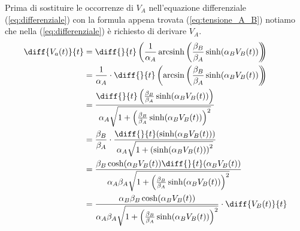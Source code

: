 		Prima di sostituire le occorrenze di $V_{A}$ nell'equazione differenziale (\ref{eq:differenziale}) con la formula appena trovata (\ref{eq:tensione_A_B}) notiamo che nella (\ref{eq:differenziale}) è richiesto di derivare $V_{A}$.
		\begin{equation}
			\label{eq:derivata_va}
			\begin{split}
				\diff{V_{a}(t)}{t} &= \diff{}{t}\left(\frac{1}{\alpha_{A}} \arcsinh \left(\frac{\beta_{B}}{\beta_{A}} \sinh(\alpha_{B}V_{B}(t))\right)\hspace{-5px}\right)\\
				&= \frac{1}{\alpha_{A}}\cdot\diff{}{t}\left(\arcsin\left(\frac{\beta_{B}}{\beta_{A}}\sinh(\alpha_{B}V_{B}(t))\right)\hspace{-5px}\right)\\
				&= \frac{\diff{}{t}\left(\frac{\beta_{B}}{\beta_{A}}\sinh(\alpha_{B}V_{B}(t))\right)}{\alpha_{A}\sqrt{1+\left(\frac{\beta_{B}}{\beta_{A}}\sinh(\alpha_{B}V_{B}(t))\right)^{2}}}\\
				&= \frac{\beta_{B}}{\beta_{A}}\cdot\frac{\diff{}{t}(\sinh(\alpha_{B}V_{B}(t)))}{\alpha_{A}\sqrt{1+\left(\sinh(\alpha_{B}V_{B}(t))\right)^{2}}}\\
				&= \frac{\beta_{B}\cosh(\alpha_{B}V_{B}(t))\diff{}{t}(\alpha_{B}V_{B}(t))}{\alpha_{A}\beta_{A}\sqrt{1+\left(\frac{\beta_{B}}{\beta_{A}}\sinh(\alpha_{B}V_{B}(t))\right)^{2}}}\\
				&= \frac{\alpha_{B}\beta_{B}\cosh(\alpha_{B}V_{B}(t))}{\alpha_{A}\beta_{A}\sqrt{1+\left(\frac{\beta_{B}}{\beta_{A}}\sinh(\alpha_{B}V_{B}(t))\right)^{2}}}\cdot\diff{V_{B}(t)}{t}
			\end{split}
		\end{equation}
		\pagebreak

